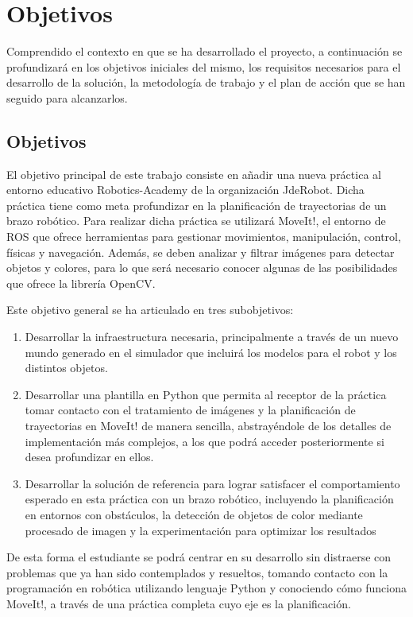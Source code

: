 \documentclass[12pt,spanish,chapterprefix, numbers=noenddot]{book}
\numberwithin{equation}{section}
\numberwithin{figure}{section}
\begin{document}
\chapter{Objetivos}
Comprendido el contexto en que se ha desarrollado el proyecto, a continuación se
profundizará en los objetivos iniciales del mismo, los requisitos necesarios para el desarrollo de la solución, la metodología de trabajo y el plan de acción que se han seguido para alcanzarlos. 

\section{Objetivos}
El objetivo principal de este trabajo consiste en añadir una nueva práctica al entorno educativo Robotics-Academy de la organización JdeRobot. Dicha práctica tiene como meta profundizar en la planificación de trayectorias de un brazo robótico. Para realizar dicha práctica se utilizará MoveIt!, el entorno de ROS que ofrece herramientas para gestionar movimientos, manipulación, control, físicas y navegación. Además, se deben analizar y filtrar imágenes para detectar objetos y colores, para lo que será necesario conocer algunas de las posibilidades que ofrece la librería OpenCV. 

Este objetivo general se ha articulado en tres subobjetivos: 

\begin{enumerate}
    \item Desarrollar la infraestructura necesaria, principalmente a través de un nuevo mundo generado en el simulador que incluirá los modelos para el robot y los distintos objetos.
    \item Desarrollar una plantilla en Python que permita al receptor de la práctica tomar contacto con el tratamiento de imágenes y la planificación de trayectorias en MoveIt! de manera sencilla, abstrayéndole de los detalles de implementación más complejos, a los que podrá acceder posteriormente si desea profundizar en ellos.
    \item Desarrollar la solución de referencia para lograr satisfacer el comportamiento esperado en esta práctica con un brazo robótico, incluyendo la planificación en entornos con obstáculos, la detección de objetos de color mediante procesado de imagen y la experimentación para optimizar los resultados
\end{enumerate}

De esta forma el estudiante se podrá centrar en su desarrollo sin distraerse con problemas que ya han sido contemplados y resueltos, tomando contacto con la programación en robótica utilizando lenguaje Python y conociendo cómo funciona MoveIt!, a través de una práctica completa cuyo eje es la planificación.
\end{document}
